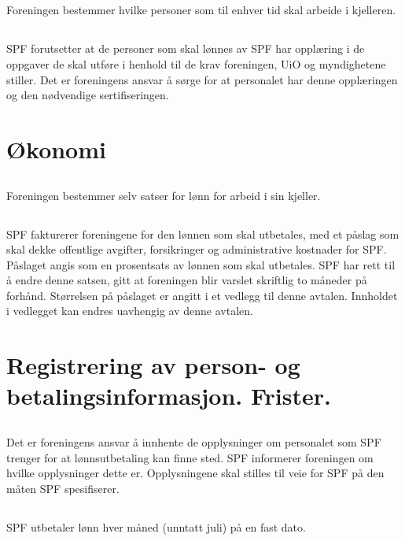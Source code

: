 \documentclass[12pt]{article}
\begin{document}
\subsection{}
\label{sub:2.3}
Foreningen bestemmer hvilke personer som til enhver 
tid skal arbeide i kjelleren.
\subsection{}
\label{sub:2.4}
SPF forutsetter at de personer som skal lønnes av 
SPF har opplæring i de oppgaver de skal utføre i 
henhold til de krav foreningen, UiO og myndighetene 
stiller. Det er foreningens ansvar å sørge for at 
personalet har denne opplæringen og den nødvendige 
sertifiseringen.
\section{Økonomi}
\label{sec:3}
\subsection{}
\label{sub:3.1}
Foreningen bestemmer selv satser for lønn for arbeid i sin kjeller.
\subsection{}
\label{sub:3.2}
SPF fakturerer foreningene for den lønnen som skal 
utbetales, med et påslag som skal dekke offentlige 
avgifter, forsikringer og administrative kostnader 
for SPF. Påslaget angis som en prosentsats av 
lønnen som skal utbetales. SPF har rett til å endre 
denne satsen, gitt at foreningen blir varslet 
skriftlig to måneder på forhånd. Størrelsen på 
påslaget er angitt i et vedlegg til denne avtalen. 
Innholdet i vedlegget kan endres uavhengig av denne 
avtalen.

\section{Registrering av person- og betalingsinformasjon. Frister.}
\label{sec:4}
\subsection{}
\label{sub:4.1}
Det er foreningens ansvar å innhente de opplysninger om personalet som SPF trenger for at lønnsutbetaling kan finne sted. SPF informerer foreningen om hvilke opplysninger dette er.
Opplysningene skal stilles til veie for SPF på den måten SPF spesifiserer.
\subsection{}
\label{sub:4.2}
SPF utbetaler lønn hver måned (unntatt juli) på en fast dato.
\end{document}
